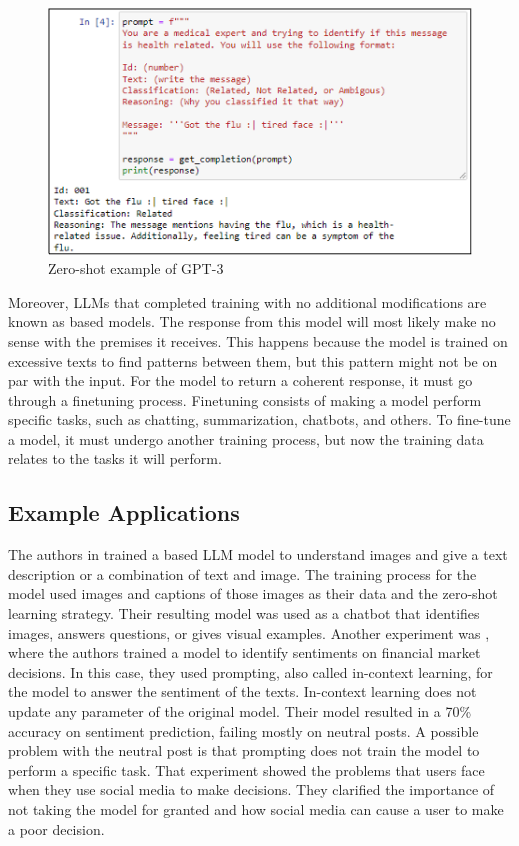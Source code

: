  \begin{figure}[!h]
    \centering
        \includegraphics[width=0.9\linewidth]{images/gpt_example.png}
        \caption{Zero-shot example of GPT-3}
        \label{gpt_example}
\end{figure}


Moreover, LLMs that completed training with no additional modifications are known as based models. The response from this model will most likely make no sense with the premises it receives.
This happens because the model is trained on excessive texts to find patterns between them, but this pattern might not be on par with the input. For the model to return a coherent response, it must go
through a finetuning process. Finetuning consists of making a model perform specific tasks, such as chatting, summarization, chatbots, and others.
To fine-tune a model, it must undergo another training process, but now the training data relates to the tasks it will perform. 

\subsection{Example Applications}
The authors in \cite{koh2023groundinglanguagemodelsimages} trained a based LLM model to understand images and give a text description or a combination of text and image. The training process for
the model used images and captions of those images as their data and the zero-shot learning strategy. Their resulting model was used as a chatbot that identifies images, answers questions, or gives
visual examples. Another experiment was \cite{inproceedings}, where the authors trained a model to identify sentiments on financial market decisions. In this case, they used prompting, also called in-context learning, for 
the model to answer the sentiment of the texts. In-context learning does not update any parameter of the original model. Their model resulted in a 70\% accuracy on sentiment prediction, failing mostly on neutral posts.
A possible problem with the neutral post is that prompting does not train the model to perform a specific task. That experiment showed the problems that users face when they use social media to make decisions.
They clarified the importance of not taking the model for granted and how social media can cause a user to make a poor decision.

